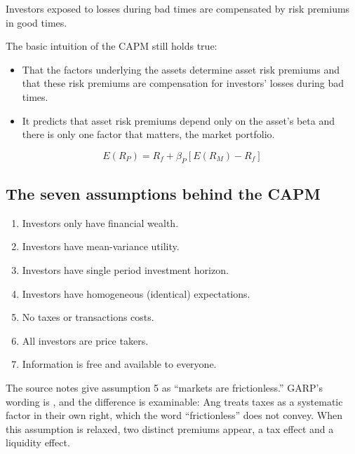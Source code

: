 \begin{imkeybox}
Investors exposed to losses during bad times are compensated by risk premiums in
good times.
\end{imkeybox}


The basic intuition of the CAPM still holds true:

\begin{itemize}
\item That the factors underlying the assets determine asset risk premiums and
that these risk premiums are compensation for investors' losses during bad times.
\item It predicts that asset risk premiums depend only on the asset's beta and
there is only one factor that matters, the market portfolio.
\end{itemize}

\begin{imfmlbox}
\[ E(R_P) = R_f + \beta_P\left[E(R_M) - R_f\right] \]
\end{imfmlbox}

\subsection{The seven assumptions behind the CAPM}

\begin{enumerate}
\item Investors only have financial wealth.
\item Investors have mean-variance utility.
\item Investors have single period investment horizon.
\item Investors have homogeneous (identical) expectations.
\item No taxes or transactions costs.
\item All investors are price takers.
\item Information is free and available to everyone.
\end{enumerate}

\begin{imtrapbox}[title={Assumption 5 is about taxes, not just friction}]
The source notes give assumption 5 as ``markets are frictionless.'' GARP's
wording is , and the difference is
examinable: Ang treats taxes as a systematic factor in their own right, which the
word ``frictionless'' does not convey. When this assumption is relaxed, two
distinct premiums appear, a tax effect and a liquidity effect.
\end{imtrapbox}

